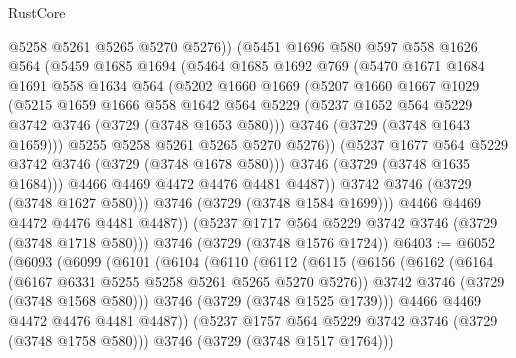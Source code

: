 \begin{lexlean}{RustCore}
\begin{coremodule}
              @5258
              @5261
              @5265
              @5270
              @5276))
          (@5451
            @1696
            @580
            @597
            @558
            @1626
            @564
            (@5459
              @1685
              @1694
              (@5464
                @1685
                @1692
                @769
                (@5470
                  @1671
                  @1684
                  @1691
                  @558
                  @1634
                  @564
                  (@5202
                    @1660
                    @1669
                    (@5207
                      @1660
                      @1667
                      @1029
                      (@5215
                        @1659
                        @1666
                        @558
                        @1642
                        @564
                        @5229
                        (@5237 @1652 @564 @5229 @3742 @3746 (@3729 (@3748 @1653 @580)))
                        @3746
                        (@3729 (@3748 @1643 @1659)))
                      @5255
                      @5258
                      @5261
                      @5265
                      @5270
                      @5276))
                  (@5237 @1677 @564 @5229 @3742 @3746 (@3729 (@3748 @1678 @580)))
                  @3746
                  (@3729 (@3748 @1635 @1684)))
                @4466
                @4469
                @4472
                @4476
                @4481
                @4487))
            @3742
            @3746
            (@3729 (@3748 @1627 @580)))
          @3746
          (@3729 (@3748 @1584 @1699)))
        @4466
        @4469
        @4472
        @4476
        @4481
        @4487))
    (@5237 @1717 @564 @5229 @3742 @3746 (@3729 (@3748 @1718 @580)))
    @3746
    (@3729 (@3748 @1576 @1724))
@6403 := @6052
    (@6093
      (@6099
        (@6101
          (@6104
            (@6110
              (@6112
                (@6115
                  (@6156
                    (@6162
                      (@6164 (@6167 @6331 @5255 @5258 @5261 @5265 @5270 @5276))
                      @3742
                      @3746
                      (@3729 (@3748 @1568 @580)))
                    @3746
                    (@3729 (@3748 @1525 @1739)))
                  @4466
                  @4469
                  @4472
                  @4476
                  @4481
                  @4487))
              (@5237 @1757 @564 @5229 @3742 @3746 (@3729 (@3748 @1758 @580)))
              @3746
              (@3729 (@3748 @1517 @1764)))

\end{coremodule}
\end{lexlean}
